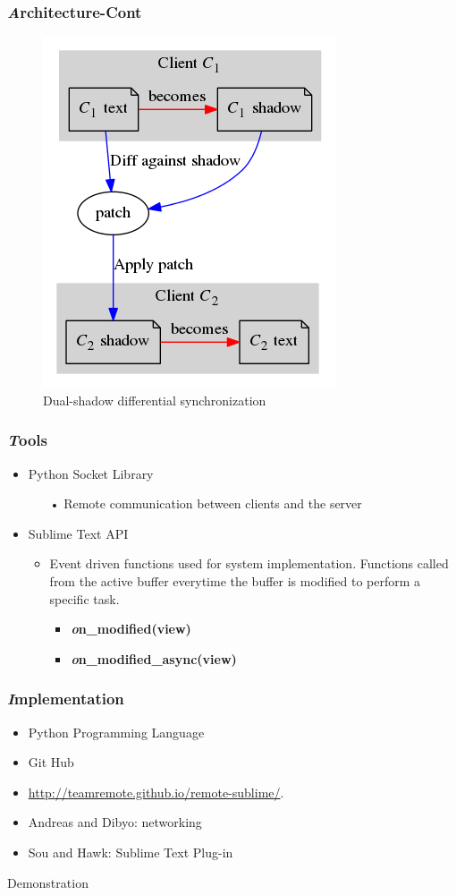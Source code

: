 \documentclass{beamer}
\begin{document}
\begin{frame}
\frametitle {\textbf{\textit Architecture-Cont}}
	\begin{figure}
		\centering
		\includegraphics[width=0.5\linewidth]{diffsync.png}
		\caption{Dual-shadow differential synchronization}
		\label{fig:diffsync}
	\end{figure}
\end{frame}

\begin{frame}
\frametitle{\textbf{\textit Tools}}
\begin{itemize}
\item Python Socket Library
\begin{itemize}
\item[•]Remote communication between clients and the server
\end{itemize}
\item Sublime Text API
\begin{itemize}
\item Event driven functions used for system implementation. Functions called from the active buffer everytime the buffer is modified to perform a specific task.
\begin{itemize}
\item \textbf{\textit on\_modified(view)}
\item \textbf{\textit on\_modified\_async(view)}
\end{itemize}
\end{itemize}
\end{itemize}
\end{frame}

\begin{frame}
\frametitle {\textbf{\textit Implementation}}
\begin{itemize}
\item Python Programming Language
\item Git Hub
\item \url{http://teamremote.github.io/remote-sublime/}.
\item Andreas and Dibyo: networking
\item Sou and Hawk: Sublime Text Plug-in
\end{itemize}
\end{frame}



\begin{frame}
\begin{center}
\Huge Demonstration
\end{center}
\end{frame}
\end{document}
